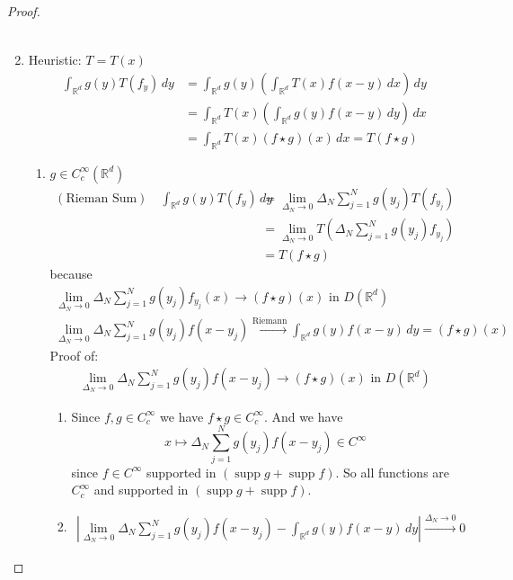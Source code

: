 \documentclass{report}
\theoremstyle{tommy}
\newcommand{\supp}{\operatorname{supp}}
\begin{document}
\begin{proof}
\begin{enumerate}[label=\alph*)]
\begin{align*}
      \end{align*}
      \item Heuristic: \(T = T(x)\)
      \begin{align*}
        \int_{\mathbb{R}^d} g(y) T(f_y) \, dy 
        &= \int_{\mathbb{R}^d} g(y) \left(\int_{\mathbb{R}^d}T(x) f(x-y) \, dx \right)\, dy \\
        &= \int_{\mathbb{R}^d} T(x) \left(\int_{\mathbb{R}^d} g(y) f(x-y) \, dy \right) \, dx \\
        &= \int_{\mathbb{R}^d} T(x) (f \star g)(x) \, dx = T(f \star g)
      \end{align*}
      \begin{enumerate}[label=Step \arabic*:]
        \item \(g \in C_c^\infty(\mathbb{R}^d)\) \begin{align*}
          (\text{Rieman Sum}) \quad \int_{\mathbb{R}^d} g(y) T(f_y) \, dy 
          &= \lim_{\Delta_N \to 0} \Delta_N \sum_{j=1}^N g(y_j) T(f_{y_j}) \\
          &= \lim_{\Delta_N \to 0} T\left(\Delta_N \sum_{j=1}^N g(y_j) f_{y_j}\right) \\
          &= T(f\star g)
        \end{align*}
        because
        \begin{align*}
          \lim_{\Delta_N \to 0} \Delta_N \sum_{j=1}^N g(y_j) f_{y_j} (x) \to (f\star g)(x) \text{ in } D(\mathbb{R}^d) \\
          \lim_{\Delta_N \to 0} \Delta_N \sum_{j=1}^N g(y_j) f(x-y_j) \xrightarrow{\text{Riemann}} \int_{\mathbb{R}^d} g(y) f(x-y) \, dy = (f \star g)(x)
        \end{align*}
        Proof of: 
        \begin{align*}
          \lim_{\Delta_N \to 0} \Delta_N \sum_{j=1}^N g(y_j) f(x-y_j) \to (f\star g)(x) \text{ in } D(\mathbb{R}^d)
        \end{align*}
        \begin{enumerate}[label=\arabic*)]
          \item Since \(f, g \in C_c^\infty\) we have \(f \star g \in C_c^\infty\). And we have \[x \mapsto \Delta_N \sum_{j=1}^N g(y_j) f(x-y_j) \in C^\infty\] since \(f \in C^\infty\) supported in \((\supp g + \supp f)\). So all functions are \(C_c^\infty\) and supported in \((\supp g + \supp f)\).
          \item 
          \begin{align*}
            \left| \lim_{\Delta_N \to 0} \Delta_N \sum_{j=1}^N g(y_j) f(x-y_j) - \int_{\mathbb{R}^d} g(y) f(x-y) \, dy \right| \xrightarrow{\Delta_N \to 0} 0

\end{align*}
\end{enumerate}
\end{enumerate}
\end{enumerate}
\end{proof}
\end{document}
